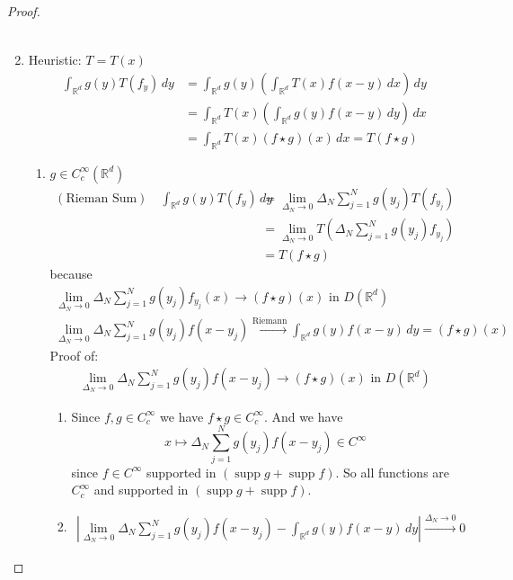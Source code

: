 \documentclass{report}
\theoremstyle{tommy}
\newcommand{\supp}{\operatorname{supp}}
\begin{document}
\begin{proof}
\begin{enumerate}[label=\alph*)]
\begin{align*}
      \end{align*}
      \item Heuristic: \(T = T(x)\)
      \begin{align*}
        \int_{\mathbb{R}^d} g(y) T(f_y) \, dy 
        &= \int_{\mathbb{R}^d} g(y) \left(\int_{\mathbb{R}^d}T(x) f(x-y) \, dx \right)\, dy \\
        &= \int_{\mathbb{R}^d} T(x) \left(\int_{\mathbb{R}^d} g(y) f(x-y) \, dy \right) \, dx \\
        &= \int_{\mathbb{R}^d} T(x) (f \star g)(x) \, dx = T(f \star g)
      \end{align*}
      \begin{enumerate}[label=Step \arabic*:]
        \item \(g \in C_c^\infty(\mathbb{R}^d)\) \begin{align*}
          (\text{Rieman Sum}) \quad \int_{\mathbb{R}^d} g(y) T(f_y) \, dy 
          &= \lim_{\Delta_N \to 0} \Delta_N \sum_{j=1}^N g(y_j) T(f_{y_j}) \\
          &= \lim_{\Delta_N \to 0} T\left(\Delta_N \sum_{j=1}^N g(y_j) f_{y_j}\right) \\
          &= T(f\star g)
        \end{align*}
        because
        \begin{align*}
          \lim_{\Delta_N \to 0} \Delta_N \sum_{j=1}^N g(y_j) f_{y_j} (x) \to (f\star g)(x) \text{ in } D(\mathbb{R}^d) \\
          \lim_{\Delta_N \to 0} \Delta_N \sum_{j=1}^N g(y_j) f(x-y_j) \xrightarrow{\text{Riemann}} \int_{\mathbb{R}^d} g(y) f(x-y) \, dy = (f \star g)(x)
        \end{align*}
        Proof of: 
        \begin{align*}
          \lim_{\Delta_N \to 0} \Delta_N \sum_{j=1}^N g(y_j) f(x-y_j) \to (f\star g)(x) \text{ in } D(\mathbb{R}^d)
        \end{align*}
        \begin{enumerate}[label=\arabic*)]
          \item Since \(f, g \in C_c^\infty\) we have \(f \star g \in C_c^\infty\). And we have \[x \mapsto \Delta_N \sum_{j=1}^N g(y_j) f(x-y_j) \in C^\infty\] since \(f \in C^\infty\) supported in \((\supp g + \supp f)\). So all functions are \(C_c^\infty\) and supported in \((\supp g + \supp f)\).
          \item 
          \begin{align*}
            \left| \lim_{\Delta_N \to 0} \Delta_N \sum_{j=1}^N g(y_j) f(x-y_j) - \int_{\mathbb{R}^d} g(y) f(x-y) \, dy \right| \xrightarrow{\Delta_N \to 0} 0

\end{align*}
\end{enumerate}
\end{enumerate}
\end{enumerate}
\end{proof}
\end{document}
